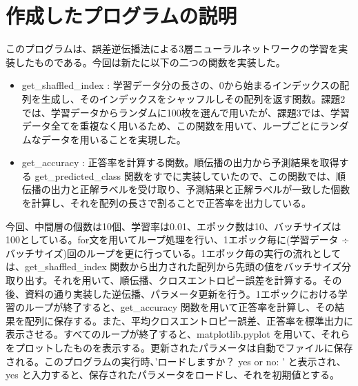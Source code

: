 \documentclass[11px,a4,dvipdfmx]{jsarticle}
\begin{document}
\section{作成したプログラムの説明}
このプログラムは、誤差逆伝播法による3層ニューラルネットワークの学習を実装したものである。今回は新たに以下の二つの関数を実装した。
\begin{itemize}
    \item get\_shaffled\_index : 学習データ分の長さの、0から始まるインデックスの配列を生成し、そのインデックスをシャッフルしその配列を返す関数。課題2では、学習データからランダムに100枚を選んで用いたが、課題3では、学習データ全てを重複なく用いるため、この関数を用いて、ループごとにランダムなデータを用いることを実現した。
    \item get\_accuracy : 正答率を計算する関数。順伝播の出力から予測結果を取得する get\_predicted\_class 関数をすでに実装していたので、この関数では、順伝播の出力と正解ラベルを受け取り、予測結果と正解ラベルが一致した個数を計算し、それを配列の長さで割ることで正答率を出力している。
\end{itemize}
今回、中間層の個数は10個、学習率は0.01、エポック数は10、バッチサイズは100としている。for文を用いてループ処理を行い、1エポック毎に(学習データ ÷ バッチサイズ)回のループを更に行っている。1エポック毎の実行の流れとしては、get\_shaffled\_index 関数から出力された配列から先頭の値をバッチサイズ分取り出す。それを用いて、順伝播、クロスエントロピー誤差を計算する。その後、資料の通り実装した逆伝播、パラメータ更新を行う。1エポックにおける学習のループが終了すると、get\_accuracy 関数を用いて正答率を計算し、その結果を配列に保存する。また、平均クロスエントロピー誤差、正答率を標準出力に表示させる。すべてのループが終了すると、matplotlib.pyplot を用いて、それらをプロットしたものを表示する。更新されたパラメータは自動でファイルに保存される。このプログラムの実行時、'ロードしますか？ yes or no:  ' と表示され、yes と入力すると、保存されたパラメータをロードし、それを初期値とする。
\end{document}
